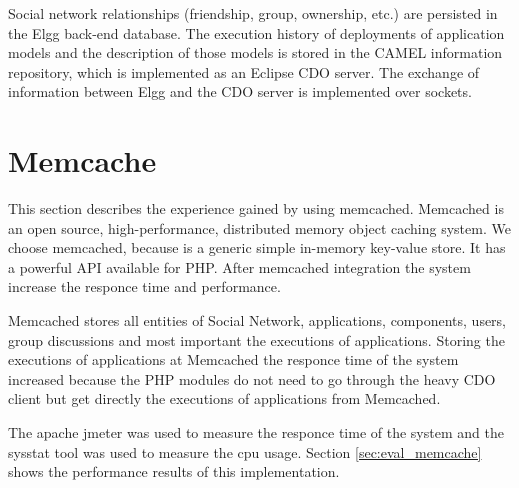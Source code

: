 Social network relationships (friendship, group, ownership, etc.) are persisted in the Elgg back-end database. The execution history of deployments of application models and the description of those models is stored in the CAMEL information repository, which is implemented as an Eclipse CDO server. The exchange of information between Elgg and the CDO server is implemented over sockets.

\section{Memcache}
\label{sec:memcache_implementation}
This section describes the experience gained by using memcached\cite{memcache_url}. Memcached is an open source, high-performance, distributed memory object caching system. We choose memcached, because is a generic simple in-memory key-value store. It has a powerful API available for PHP. After memcached integration the system increase the responce time and performance.

Memcached stores all entities of Social Network, applications, components, users, group discussions and most important the executions of applications. Storing the executions of applications at Memcached the responce time of the system increased because the PHP modules do not need to go through the heavy CDO client but get directly the executions of applications from Memcached.

The apache jmeter\cite{jmeter_url} was used to measure the responce time of the system and the sysstat tool\cite{sysstat_url} was used to measure the cpu usage. Section \ref{sec:eval_memcache} 
 shows the performance results of this implementation.

